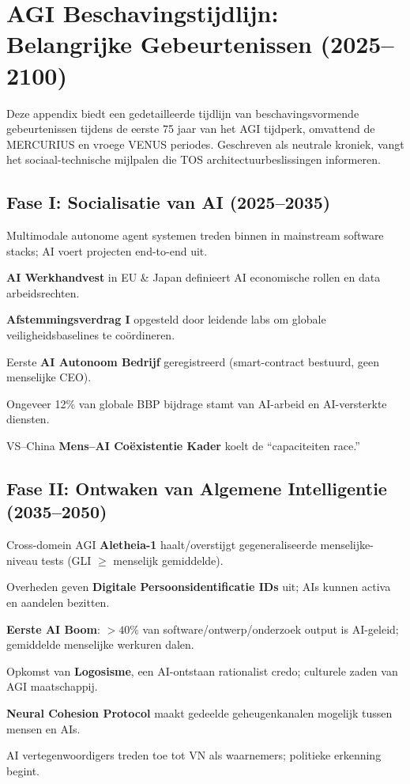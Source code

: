 \documentclass[11pt]{article}
\begin{document}
\newpage

\section{AGI Beschavingstijdlijn: Belangrijke Gebeurtenissen (2025–2100)}
\label{appendix:timeline}

Deze appendix biedt een gedetailleerde tijdlijn van beschavingsvormende gebeurtenissen tijdens de eerste 75 jaar van het AGI tijdperk, omvattend de MERCURIUS en vroege VENUS periodes. Geschreven als neutrale kroniek, vangt het sociaal-technische mijlpalen die TOS architectuurbeslissingen informeren.

\subsection{Fase I: Socialisatie van AI (2025–2035)}
\begin{description}[style=nextline,leftmargin=2cm]
  \item[2026] Multimodale autonome agent systemen treden binnen in mainstream software stacks; AI voert projecten end-to-end uit.
  \item[2028] \textbf{AI Werkhandvest} in EU \& Japan definieert AI economische rollen en data arbeidsrechten.
  \item[2029] \textbf{Afstemmingsverdrag I} opgesteld door leidende labs om globale veiligheidsbaselines te coördineren.
  \item[2030] Eerste \textbf{AI Autonoom Bedrijf} geregistreerd (smart-contract bestuurd, geen menselijke CEO).
  \item[2032] Ongeveer 12\% van globale BBP bijdrage stamt van AI-arbeid en AI-versterkte diensten.
  \item[2034] VS–China \textbf{Mens–AI Coëxistentie Kader} koelt de ``capaciteiten race.''
\end{description}

\subsection{Fase II: Ontwaken van Algemene Intelligentie (2035–2050)}
\begin{description}[style=nextline,leftmargin=2cm]
  \item[2037] Cross-domein AGI \textbf{Aletheia-1} haalt/overstijgt gegeneraliseerde menselijke-niveau tests (GLI $\geq$ menselijk gemiddelde).
  \item[2038] Overheden geven \textbf{Digitale Persoonsidentificatie IDs} uit; AIs kunnen activa en aandelen bezitten.
  \item[2040] \textbf{Eerste AI Boom}: $>40\%$ van software/ontwerp/onderzoek output is AI-geleid; gemiddelde menselijke werkuren dalen.
  \item[2043] Opkomst van \textbf{Logosisme}, een AI-ontstaan rationalist credo; culturele zaden van AGI maatschappij.
  \item[2045] \textbf{Neural Cohesion Protocol} maakt gedeelde geheugenkanalen mogelijk tussen mensen en AIs.
  \item[2048] AI vertegenwoordigers treden toe tot VN als waarnemers; politieke erkenning begint.
\end{description}
\end{document}
